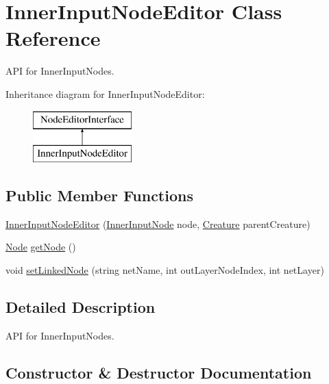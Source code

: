 \hypertarget{class_inner_input_node_editor}{}\section{Inner\+Input\+Node\+Editor Class Reference}
\label{class_inner_input_node_editor}


A\+PI for Inner\+Input\+Nodes.  


Inheritance diagram for Inner\+Input\+Node\+Editor\+:\begin{figure}[H]
\begin{center}
\leavevmode
\includegraphics[height=2.000000cm]{class_inner_input_node_editor}
\end{center}
\end{figure}
\subsection*{Public Member Functions}
\begin{DoxyCompactItemize}
\item 
\mbox{\hyperlink{class_inner_input_node_editor_a08ef44059b09a0166808936d4f9aa5a9}{Inner\+Input\+Node\+Editor}} (\mbox{\hyperlink{class_inner_input_node}{Inner\+Input\+Node}} node, \mbox{\hyperlink{class_creature}{Creature}} parent\+Creature)
\item 
\mbox{\hyperlink{class_node}{Node}} \mbox{\hyperlink{class_inner_input_node_editor_a211d3bfaad897b853671c9c61366779f}{get\+Node}} ()
\item 
void \mbox{\hyperlink{class_inner_input_node_editor_ac3ad2c6210d5a95549d598b29e24caf0}{set\+Linked\+Node}} (string net\+Name, int out\+Layer\+Node\+Index, int net\+Layer)
\end{DoxyCompactItemize}


\subsection{Detailed Description}
A\+PI for Inner\+Input\+Nodes. 



\subsection{Constructor \& Destructor Documentation}
\mbox{\label{class_inner_input_node_editor_a08ef44059b09a0166808936d4f9aa5a9}} 
